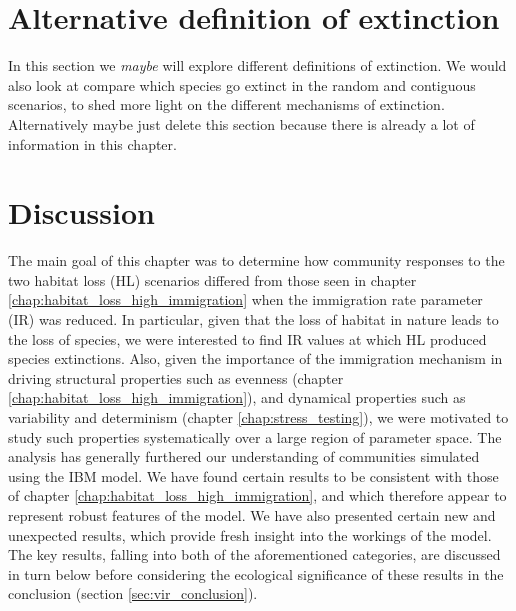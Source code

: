 \section{Alternative definition of extinction}
\label{sec:extinction}

In this section we \emph{maybe} will explore different definitions of extinction. We would also look at compare which species go extinct in the random and contiguous scenarios, to shed more light on the different mechanisms of extinction. Alternatively maybe just delete this section because there is already a lot of information in this chapter.

%

\section{Discussion}
\label{sec:vir_discussion}


The main goal of this chapter was to determine how community responses to the two habitat loss (HL) scenarios differed from those seen in chapter \ref{chap:habitat_loss_high_immigration} when the immigration rate parameter (IR) was reduced. In particular, given that the loss of habitat in nature leads to the loss of species, we were interested to find IR values at which HL produced species extinctions. Also, given the importance of the immigration mechanism in driving structural properties such as evenness (chapter \ref{chap:habitat_loss_high_immigration}), and dynamical properties such as variability and determinism (chapter \ref{chap:stress_testing}), we were motivated to study such properties systematically over a large region of parameter space. The analysis has generally furthered our understanding of communities simulated using the IBM model. We have found certain results to be consistent with those of chapter \ref{chap:habitat_loss_high_immigration}, and which therefore appear to represent robust features of the model. We have also presented certain new and unexpected results, which provide fresh insight into the workings of the model. The key results, falling into both of the aforementioned categories, are discussed in turn below before considering the ecological significance of these results in the conclusion (section \ref{sec:vir_conclusion}). 

